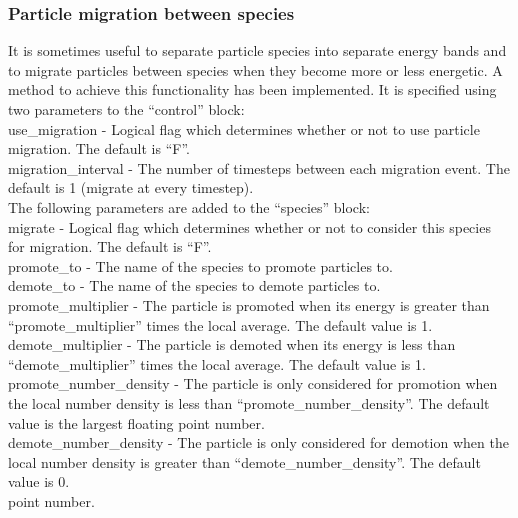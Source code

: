 \subsubsection{Particle migration between species}
\label{sec:migration}

It is sometimes useful to separate particle species into separate energy
bands and to migrate particles between species when they become more or
less energetic. A method to achieve this functionality has been implemented.
It is specified using two parameters to the ``control'' block:\\

{\emphtext use\_migration} - Logical flag which determines whether or not to
  use particle migration. The default is ``F''.\\

{\emphtext migration\_interval} - The number of timesteps between each
  migration event.  The default is 1 (migrate at every timestep).\\

The following parameters are added to the ``species'' block:\\

{\emphtext migrate} - Logical flag which determines whether or not to consider
  this species for migration. The default is ``F''.\\

{\emphtext promote\_to} - The name of the species to promote particles to.\\

{\emphtext demote\_to} - The name of the species to demote particles to.\\

{\emphtext promote\_multiplier} - The particle is promoted when its energy is
  greater than ``promote\_multiplier'' times the local average.  The default
  value is 1.\\

{\emphtext demote\_multiplier}  - The particle is demoted when its energy is
  less than ``demote\_multiplier'' times the local average.  The default value
  is 1.\\

{\emphtext promote\_number\_density} - The particle is only considered for
  promotion when the local number density is less than
  ``promote\_number\_density''.  The default value is the largest floating
  point number.\\

{\emphtext demote\_number\_density} - The particle is only considered for
  demotion when the local number density is greater than
  ``demote\_number\_density''.  The default value is 0.\\
  point number.\\



